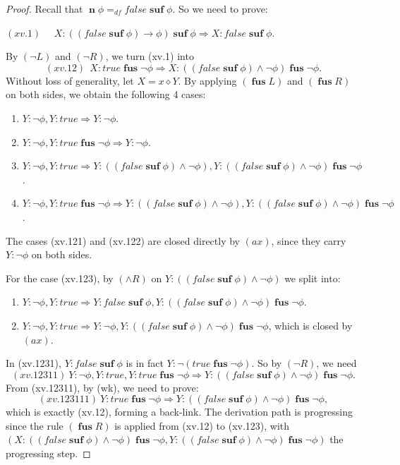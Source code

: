 \documentclass[manuscript,screen]{acmart}
\newcommand{\dddef}[0]{=_{df}}
\newcommand{\true}[0]{\mathit{true}}
\newcommand{\false}[0]{\mathit{false}}
\newcommand{\cat}[0]{\diamond}
\DeclareMathOperator{\osuf}{\mathbf{suf}}
\DeclareMathOperator{\ofus}{\mathbf{fus}}
\DeclareMathOperator{\nxt}{\mathbf{n}}
\newcommand{\A}[1]{\mbox{ \textbf{#1} }}
\newcommand{\MO}{\A{MO}}
\begin{document}
\begin{proof}

Recall that $\nxt\phi\dddef \false\osuf\phi$. 
So we need to prove:
\begin{center}
$(xv.1)$ \ \ $X : ((\false\osuf\phi)\to \phi)\osuf\phi\Rightarrow X : \false\osuf\phi$.
\end{center}

By $(\neg L)$ and $(\neg R)$, we turn (xv.1) into 
$$
(xv.12)\ \ X : \true\ofus \neg\phi\Rightarrow X : ((\false\osuf\phi)\wedge \neg\phi)\ofus \neg\phi. 
$$
Without loss of generality, let $X = x\cat Y$. 
By applying $(\ofus L)$ and $(\ofus R)$ on both sides, 
we obtain the following 4 cases: 
\begin{enumerate}
    \item[(xv.121)] $Y : \neg\phi, Y : \true\Rightarrow Y : \neg\phi$. 
    \item[(xv.122)] $Y : \neg\phi, Y : \true\ofus \neg\phi\Rightarrow Y : \neg\phi$. 
    \item[(xv.123)] $Y : \neg\phi, Y : \true\Rightarrow Y : ((\false\osuf\phi)\wedge \neg\phi), Y : ((\false\osuf\phi)\wedge \neg\phi)\ofus \neg\phi$. 
    \item[(xv.124)] $Y : \neg\phi, Y : \true\ofus \neg\phi\Rightarrow Y : ((\false\osuf\phi)\wedge \neg\phi), Y : ((\false\osuf\phi)\wedge \neg\phi)\ofus \neg\phi$. 
\end{enumerate}
The cases (xv.121) and (xv.122) are closed directly by $(ax)$, since they carry $Y : \neg\phi$ on both sides. 

For the case (xv.123), by $(\wedge R)$ on $Y : ((\false\osuf\phi)\wedge \neg\phi)$ we split into: 
\begin{enumerate}
    \item[(xv.1231)] $Y : \neg\phi, Y : \true\Rightarrow Y : \false\osuf\phi, Y : ((\false\osuf\phi)\wedge \neg\phi)\ofus \neg\phi$. 
    \item[(xv.1232)] $Y : \neg\phi, Y : \true\Rightarrow Y : \neg\phi, Y : ((\false\osuf\phi)\wedge \neg\phi)\ofus \neg\phi$, which is closed by $(ax)$. 
\end{enumerate}
In (xv.1231), $Y : \false\osuf\phi$ is in fact $Y : \neg(\true\ofus\neg\phi)$. So by $(\neg R)$, we need
$$
(xv.12311)\ Y : \neg\phi, Y : \true, Y : \true\ofus\neg\phi\Rightarrow Y : ((\false\osuf\phi)\wedge \neg\phi)\ofus \neg\phi. 
$$
From (xv.12311), by (wk), we need to prove:
$$
(xv.123111)\ Y : \true\ofus\neg\phi\Rightarrow Y : ((\false\osuf\phi)\wedge \neg\phi)\ofus \neg\phi, 
$$
which is exactly (xv.12), forming a back-link. The derivation path is progressing since the rule $(\ofus R)$ is applied from (xv.12) to (xv.123), with $(X : ((\false\osuf\phi)\wedge \neg\phi)\ofus \neg\phi, Y : ((\false\osuf\phi)\wedge \neg\phi)\ofus \neg\phi)$ the progressing step. 


\end{proof}
\end{document}
